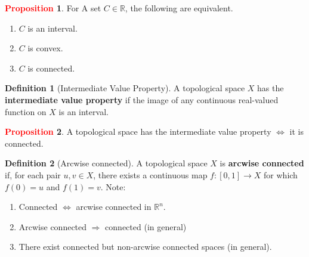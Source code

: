 \documentclass[11pt]{article}
\theoremstyle{definition}
\theoremstyle{definition}
\newcommand{\R}[0]{\mathbb{R}}
\theoremstyle{definition}
\newtheorem{definition}{\textcolor{OliveGreen}{Definition}}
\newtheorem{prop}{\textcolor{red}{Proposition}}
\theoremstyle{remark}
\begin{document}
\begin{prop}
	For A set $C \in \R$, the following are equivalent. 
	\begin{enumerate}[noitemsep]
		\item $C$ is an interval. 
		\item $C$ is convex. 
		\item $C$ is connected. 
	\end{enumerate}
\end{prop}

\begin{definition}[Intermediate Value Property]
	A topological space $X$ has the \textbf{intermediate value property} if the image of any continuous real-valued function on $X$ is an interval. 
\end{definition}

\begin{prop}
	A topological space has the intermediate value property $\iff$ it is connected. 
\end{prop}

\begin{definition}[Arcwise connected]
	A topological space $X$ is \textbf{arcwise connected} if, for each pair $u, v \in X$, there exists a continuous map $f: [0,1] \rightarrow X$ for which $f(0) = u$ and $f(1) = v$. Note: 
	\begin{enumerate}[noitemsep]
		\item Connected $\iff$ arcwise connected in $\R^n$. 
		\item Arcwise connected $\Rightarrow$ connected (in general) 
		\item There exist connected but non-arcwise connected spaces (in general). 
	\end{enumerate}
\end{definition}
\end{document}
